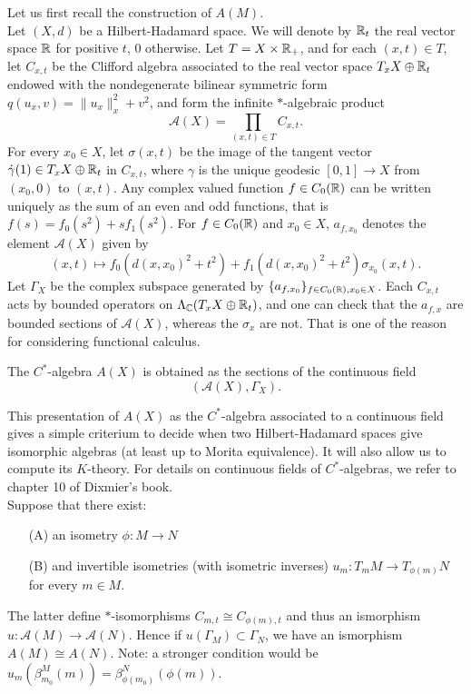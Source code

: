 Let us first recall the construction of $A(M)$.\\

Let $(X,d)$ be a Hilbert-Hadamard space. We will denote by $\mathbb R_t$ the real vector space $\mathbb R$ for positive $t$, $0$ otherwise. Let $T= X\times \mathbb R_+$, and for each $(x,t)\in T$, let $C_{x,t}$ be the Clifford algebra associated to the real vector space $T_x X \oplus \mathbb R_t$ endowed with the nondegenerate bilinear symmetric form $q(u_x,v)= \|u_x\|_x^2+ v^2$, and form the infinite %
$*$-algebraic product 
\[\mathcal A(X) = \prod_{(x,t)\in T} C_{x,t}.\]
 For every $x_0\in X$, let $\sigma(x,t)$ be the image of the tangent vector $\dot\gamma(1)\in T_x X \oplus \mathbb R_t$ in $C_{x,t}$, where $\gamma$ is the unique geodesic $[0,1]\rightarrow X$ from $(x_0,0)$ to $(x,t)$. Any complex valued function $f\in C_0(\mathbb R) $ can be written uniquely as the sum of an even and odd functions, that is $f(s) = f_0(s^2)+sf_1(s^2)$. For $f\in C_0(\mathbb R)$ and $x_0\in X$, $a_{f,x_0}$ denotes the element $\mathcal A(X)$ given by 
 \[ (x,t) \mapsto f_0(d(x,x_0)^2+t^2) +  f_1(d(x,x_0)^2+t^2) \sigma_{x_0}(x,t).\]
Let $\Gamma_X$ be the complex subspace generated by $\{a_{f,x_0} \}_{f\in C_0(\mathbb R) , x_0\in X}$. Each $C_{x,t}$ acts by bounded operators on $\Lambda_\mathbb C (T_x X \oplus \mathbb R_t)$, and one can check that the $a_{f,x}$ are bounded sections of $\mathcal A(X)$, whereas the $\sigma_x$ are not. That is one of the reason for considering functional calculus.

\begin{definition}
The $C^*$-algebra $A(X)$ is obtained as the sections of the continuous field 
\[(\mathcal A(X), \Gamma_X ).\]
\end{definition}

This presentation of $A(X)$ as the $C^*$-algebra associated to a continuous field gives a simple criterium to decide when two Hilbert-Hadamard spaces give isomorphic algebras (at least up to Morita equivalence). It will also allow us to compute its $K$-theory. For details on continuous fields of $C^*$-algebras, we refer to chapter 10 of Dixmier's book\cite{dixmier}.\\

Suppose that there exist: 
\begin{itemize}
\item[(A)] an isometry $\phi: M \rightarrow N$ 
\item[(B)] and invertible isometries (with isometric inverses) $u_m: T_m M \rightarrow T_{\phi(m)}N$ for every $m\in M$.
\end{itemize} 
The latter define $*$-isomorphisms $C_{m,t} \cong C_{\phi(m),t}$ and thus an ismorphism $u : \mathcal A(M)\rightarrow \mathcal A(N)$. Hence if $u(\Gamma_M)\subset \Gamma_N$, we have an ismorphism $A(M)\cong A(N)$. Note: a stronger condition would be  $u_m(\beta^M_{m_0}(m))= \beta^N_{\phi(m_0)}(\phi(m))$.\\ 

